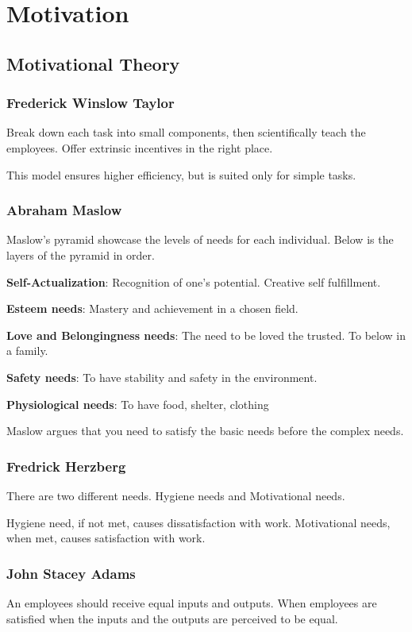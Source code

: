 \documentclass{standalone}
\begin{document}
\chapter{Motivation}

\section{Motivational Theory}

\subsection{Frederick Winslow Taylor}
Break down each task into small components, then scientifically teach the employees.
Offer extrinsic incentives in the right place.

This model ensures higher efficiency, but is suited only for simple tasks.

\subsection{Abraham Maslow}
Maslow's pyramid showcase the levels of needs for each individual.
Below is the layers of the pyramid in order.

\textbf{Self-Actualization}: Recognition of one's potential.
Creative self fulfillment.

\textbf{Esteem needs}: Mastery and achievement in a chosen field.

\textbf{Love and Belongingness needs}: The need to be loved the trusted. 
To below in a family.

\textbf{Safety needs}: To have stability and safety in the environment.

\textbf{Physiological needs}: To have food, shelter, clothing

Maslow argues that you need to satisfy the basic needs before the complex needs.

\subsection{Fredrick Herzberg}
There are two different needs.
Hygiene needs and Motivational needs.

Hygiene need, if not met, causes dissatisfaction with work.
Motivational needs, when met, causes satisfaction with work.

\subsection{John Stacey Adams}
An employees should receive equal inputs and outputs.
When employees are satisfied when the inputs and the outputs are perceived to be equal.
\end{document}

